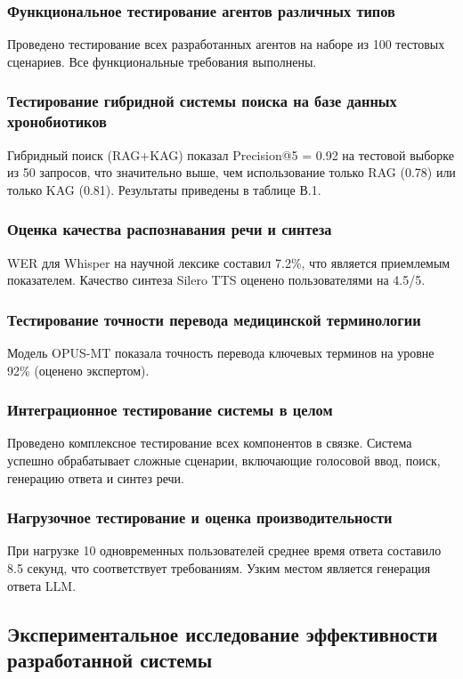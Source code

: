 \documentclass[a4paper,14pt]{extarticle}
\begin{document}
	\subsubsection{Функциональное тестирование агентов различных типов}
	Проведено тестирование всех разработанных агентов на наборе из 100 тестовых сценариев. Все функциональные требования выполнены.
	
	\subsubsection{Тестирование гибридной системы поиска на базе данных хронобиотиков}
	Гибридный поиск (RAG+KAG) показал Precision@5 = 0.92 на тестовой выборке из 50 запросов, что значительно выше, чем использование только RAG (0.78) или только KAG (0.81). Результаты приведены в таблице В.1.
	
	\subsubsection{Оценка качества распознавания речи и синтеза}
	WER для Whisper на научной лексике составил 7.2\%, что является приемлемым показателем. Качество синтеза Silero TTS оценено пользователями на 4.5/5.
	
	\subsubsection{Тестирование точности перевода медицинской терминологии}
	Модель OPUS-MT показала точность перевода ключевых терминов на уровне 92\% (оценено экспертом).
	
	\subsubsection{Интеграционное тестирование системы в целом}
	Проведено комплексное тестирование всех компонентов в связке. Система успешно обрабатывает сложные сценарии, включающие голосовой ввод, поиск, генерацию ответа и синтез речи.
	
	\subsubsection{Нагрузочное тестирование и оценка производительности}
	При нагрузке 10 одновременных пользователей среднее время ответа составило 8.5 секунд, что соответствует требованиям. Узким местом является генерация ответа LLM.
	
	\subsection{Экспериментальное исследование эффективности разработанной системы}
	
\end{document}
